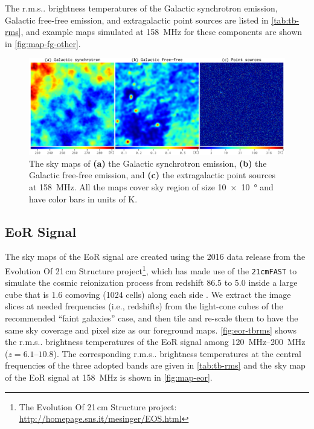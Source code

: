 \documentclass[twocolumn]{aastex62}
\makeatletter
\newcommand{\rms}{r.m.s\@ifnextchar.{}{.\@}}
\makeatother
\begin{document}
The \rms{} brightness temperatures of the Galactic synchrotron emission,
Galactic free-free emission, and extragalactic point sources are listed
in \autoref{tab:tb-rms}, and example maps simulated at \SI{158}{\MHz}
for these components are shown in \autoref{fig:map-fg-other}.

\begin{figure}
  \centering
  \includegraphics[width=\textwidth]{foregrounds-f158}
  \caption{\label{fig:map-fg-other}%
    The sky maps of
    \textbf{(a)} the Galactic synchrotron emission,
    \textbf{(b)} the Galactic free-free emission, and
    \textbf{(c)} the extragalactic point sources
    at \SI{158}{\MHz}.
    All the maps cover sky region of size
    \SI[product-units=repeat]{10 x 10}{\degree}
    and have color bars in units of \si{\kelvin}.
  }
\end{figure}


\subsection{EoR Signal}
\label{sec:eor-signal}

The sky maps of the EoR signal are created using the 2016 data release
from the Evolution Of 21\,cm Structure project\footnote{%
  The Evolution Of 21\,cm Structure project:
  \url{http://homepage.sns.it/mesinger/EOS.html}},
which has made use of the \texttt{21cmFAST} to simulate the cosmic
reionization process from redshift 86.5 to 5.0 inside a large cube that is
1.6 comoving \si{\Gpc} (1024 cells) along each side \citep{mesinger2016}.
We extract the image slices at needed frequencies (i.e., redshifts) from
the light-cone cubes of the recommended \enquote{faint galaxies} case,
and then tile and re-scale them to have the same sky coverage and
pixel size as our foreground maps.
\autoref{fig:eor-tbrms} shows the \rms{} brightness temperatures of the
EoR signal among \SIrange{120}{200}{\MHz} ($z = \numrange{6.1}{10.8}$).
The corresponding \rms{} brightness temperatures at the central
frequencies of the three adopted bands are given in \autoref{tab:tb-rms}
and the sky map of the EoR signal at \SI{158}{\MHz} is shown in
\autoref{fig:map-eor}.
\end{document}
